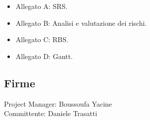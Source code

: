 \documentclass{article}
\begin{document}
\begin{flushleft}
		\begin{itemize}

			\item Allegato A: SRS.

			\item Allegato B: Analisi e valutazione dei rischi.

			\item Allegato C: RBS.

			\item Allegato D: Gantt.

		\end{itemize}

		\subsection{Firme}

		Project Manager: Boussoufa Yacine\\

		Committente: Daniele Trasatti

		

	\end{flushleft}

	

	


\end{document}
